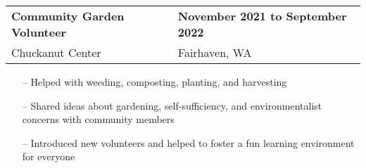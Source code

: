 \documentclass[11pt,letterpaper]{article}
\begin{document}
\begin{tabularx}{\textwidth}{lX}
    \textbf{Community Garden Volunteer} & \hfill \textbf{November 2021 to September 2022} \\[3.75pt]
    Chuckanut Center & \hfill Fairhaven, WA \\[3.75pt]
\end{tabularx}
\begin{itemize}
    \item[--] Helped with weeding, composting, planting, and harvesting
    \item[--] Shared ideas about gardening, self-sufficiency, and environmentalist concerns with community members
    \item[--] Introduced new volunteers and helped to foster a fun learning environment for everyone
\end{itemize}
\end{document}
